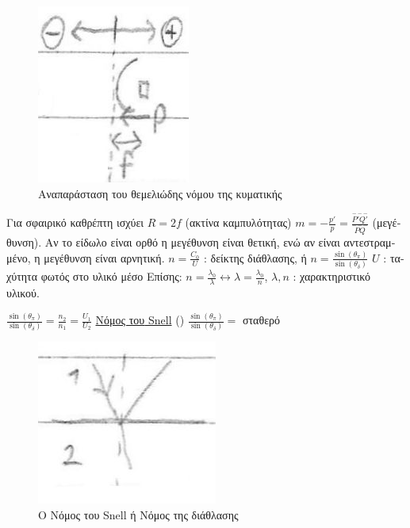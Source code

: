 \documentclass[12pt]{article}
\begin{document}
\begin{flushleft}
	\begin{figure}[H]
	\centering
	\includegraphics[scale=2]{selofan}
	\caption{\textgreek{Αναπαράσταση του θεμελιώδης νόμου της κυματικής}}
	\label{fig:selofan}
	\end{figure}
		
	\textbullet \quad \textgreek{Για σφαιρικό καθρέπτη ισχύει} $R = 2f$ (\textgreek{ακτίνα καμπυλότητας}) \linebreak 
	\textbullet \quad $\displaystyle m = -\frac{p'}{p} = \frac{\overset{---}{P'Q'}}{\overset{---}{PQ}} $ (\textgreek{μεγέθυνση}). \textgreek{Αν το είδωλο είναι ορθό η μεγέθυνση είναι \textgreek{θετική}, ενώ αν είναι αντεστραμμένο, η μεγέθυνση είναι αρνητική.} \linebreak 
	\textbullet \quad $\displaystyle n = \frac{C_0}{U}$  :  \textgreek{δείκτης διάθλασης, ή } $\displaystyle n =\frac{\sin (\theta_{\pi})}{\sin (\theta_{\delta})} $ \linebreak 
	$U$  :  \textgreek{ταχύτητα φωτός στο υλικό μέσο} \linebreak 
	\textgreek{Επίσης}: $\displaystyle n=\frac{\lambda_0}{\lambda} \leftrightarrow \lambda = \frac{\lambda_0}{n}$, $\lambda, n $  :  \textgreek{χαρακτηριστικό υλικού}. \linebreak 
	
	\textbullet \quad $\displaystyle \frac{\sin (\theta_{\pi})}{\sin (\theta_{\delta})} = \frac{n_2}{n_1} = \frac{U_1}{U_2}$ \uline{\textgreek{Νόμος του} Snell} () \linebreak 
	$\displaystyle \frac{\sin (\theta_{\pi})}{\sin (\theta_{\delta})} = $ \textgreek{σταθερό} \linebreak 
	
	\begin{figure}[H]
	\centering
	\includegraphics[scale=2]{snell}
	\caption{\textgreek{Ο Νόμος του} Snell \textgreek{ή Νόμος της διάθλασης}}
	\label{fig:snell}
	\end{figure}


\end{flushleft}
\end{document}
